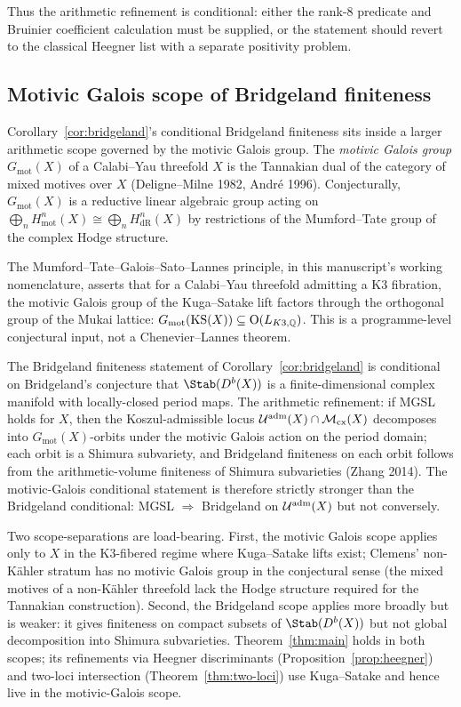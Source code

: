 Thus the arithmetic refinement is conditional: either the
rank-$8$ predicate and Bruinier coefficient calculation must be
supplied, or the statement should revert to the classical Heegner list
with a separate positivity problem.

\subsection{Motivic Galois scope of Bridgeland finiteness}
\label{subsec:motivic-galois-scope}

Corollary~\ref{cor:bridgeland}'s conditional Bridgeland finiteness sits inside a larger arithmetic scope governed by the motivic Galois group. The \emph{motivic Galois group} $G_{\mathrm{mot}}(X)$ of a Calabi--Yau threefold $X$ is the Tannakian dual of the category of mixed motives over $X$ (Deligne--Milne 1982, Andr\'e 1996). Conjecturally, $G_{\mathrm{mot}}(X)$ is a reductive linear algebraic group acting on $\bigoplus_n H^n_{\mathrm{mot}}(X) \cong \bigoplus_n H^n_{\mathrm{dR}}(X)$ by restrictions of the Mumford--Tate group of the complex Hodge structure.

The Mumford--Tate--Galois--Sato--Lannes principle, in this manuscript's
working nomenclature, asserts that for a Calabi--Yau threefold
admitting a K3 fibration, the motivic Galois group of the Kuga--Satake
lift factors through the orthogonal group of the Mukai lattice:
$G_{\mathrm{mot}}(\mathrm{KS}(X)) \subseteq \mathrm{O}(L_{K3,\mathbb{Q}})$.
This is a programme-level conjectural input, not a
Chenevier--Lannes theorem.

The Bridgeland finiteness statement of Corollary~\ref{cor:bridgeland} is conditional on Bridgeland's conjecture that $\Stab(D^b(X))$ is a finite-dimensional complex manifold with locally-closed period maps. The arithmetic refinement: if MGSL holds for $X$, then the Koszul-admissible locus $\mathcal{U}^{\mathrm{adm}}(X) \cap \mathcal{M}_{\mathrm{cx}}(X)$ decomposes into $G_{\mathrm{mot}}(X)$-orbits under the motivic Galois action on the period domain; each orbit is a Shimura subvariety, and Bridgeland finiteness on each orbit follows from the arithmetic-volume finiteness of Shimura subvarieties (Zhang 2014). The motivic-Galois conditional statement is therefore strictly stronger than the Bridgeland conditional: MGSL $\Rightarrow$ Bridgeland on $\mathcal{U}^{\mathrm{adm}}(X)$ but not conversely.

Two scope-separations are load-bearing. First, the motivic Galois scope applies only to $X$ in the K3-fibered regime where Kuga--Satake lifts exist; Clemens' non-K\"ahler stratum has no motivic Galois group in the conjectural sense (the mixed motives of a non-K\"ahler threefold lack the Hodge structure required for the Tannakian construction). Second, the Bridgeland scope applies more broadly but is weaker: it gives finiteness on compact subsets of $\Stab(D^b(X))$ but not global decomposition into Shimura subvarieties. Theorem~\ref{thm:main} holds in both scopes; its refinements via Heegner discriminants (Proposition~\ref{prop:heegner}) and two-loci intersection (Theorem~\ref{thm:two-loci}) use Kuga--Satake and hence live in the motivic-Galois scope.

